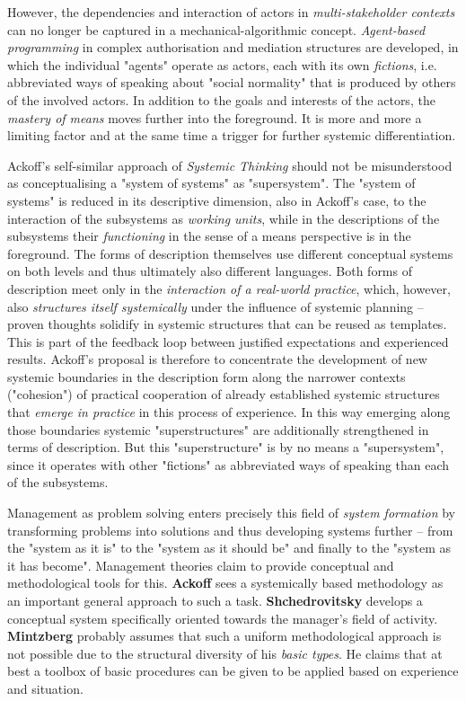 \documentclass[11pt,a4paper]{article}
\begin{document}
However, the dependencies and interaction of actors in \emph{multi-stakeholder
  contexts} can no longer be captured in a mechanical-algorithmic concept.
\emph{Agent-based programming} in complex authorisation and mediation
structures are developed, in which the individual "agents" operate as actors,
each with its own \emph{fictions}, i.e. abbreviated ways of speaking about
"social normality" that is produced by others of the involved actors. In
addition to the goals and interests of the actors, the \emph{mastery of means}
moves further into the foreground. It is more and more a limiting factor and
at the same time a trigger for further systemic differentiation.

Ackoff's self-similar approach of \emph{Systemic Thinking} should not be
misunderstood as conceptualising a "system of systems" as "supersystem". The
"system of systems" is reduced in its descriptive dimension, also in Ackoff's
case, to the interaction of the subsystems as \emph{working units}, while in
the descriptions of the subsystems their \emph{functioning} in the sense of a
means perspective is in the foreground. The forms of description themselves
use different conceptual systems on both levels and thus ultimately also
different languages. Both forms of description meet only in the
\emph{interaction of a real-world practice}, which, however, also
\emph{structures itself systemically} under the influence of systemic planning
-- proven thoughts solidify in systemic structures that can be reused as
templates. This is part of the feedback loop between justified expectations
and experienced results. Ackoff's proposal is therefore to concentrate the
development of new systemic boundaries in the description form along the
narrower contexts ("cohesion") of practical cooperation of already established
systemic structures that \emph{emerge in practice} in this process of
experience.  In this way emerging along those boundaries systemic
"superstructures" are additionally strengthened in terms of description. But
this "superstructure" is by no means a "supersystem", since it operates with
other "fictions" as abbreviated ways of speaking than each of the subsystems.

Management as problem solving enters precisely this field of \emph{system
  formation} by transforming problems into solutions and thus developing
systems further -- from the "system as it is" to the "system as it should be"
and finally to the "system as it has become". Management theories claim to
provide conceptual and methodological tools for this. \textbf{Ackoff} sees a
systemically based methodology as an important general approach to such a
task.  \textbf{Shchedrovitsky} develops a conceptual system specifically
oriented towards the manager's field of activity. \textbf{Mintzberg} probably
assumes that such a uniform methodological approach is not possible due to the
structural diversity of his \emph{basic types}. He claims that at best a
toolbox of basic procedures can be given to be applied based on experience and
situation.
\end{document}

